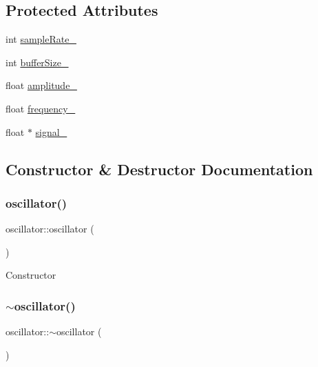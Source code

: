\subsection*{Protected Attributes}
\begin{DoxyCompactItemize}
\item 
int \hyperlink{classoscillator_aa5a47eb31b518199eaebe930ecef6a24}{sample\+Rate\+\_\+}
\item 
int \hyperlink{classoscillator_ab5c1b6a45c5d7026d91db8cbdd1e24ee}{buffer\+Size\+\_\+}
\item 
float \hyperlink{classoscillator_a5671a761666b50a469a4121ef0e0e864}{amplitude\+\_\+}
\item 
float \hyperlink{classoscillator_acf622297ac31e0013eff3fe230a5d9c9}{frequency\+\_\+}
\item 
float $\ast$ \hyperlink{classoscillator_ab8f77116d390662aa2e6ce1fa2acc54f}{signal\+\_\+}
\end{DoxyCompactItemize}


\subsection{Constructor \& Destructor Documentation}
\mbox{\label{classoscillator_aa262e2f748efad616dbdeee5862e5e95}} 
\subsubsection{\texorpdfstring{oscillator()}{oscillator()}}
{\footnotesize\ttfamily oscillator\+::oscillator (\begin{DoxyParamCaption}{ }\end{DoxyParamCaption})}

Constructor \mbox{\label{classoscillator_a17b258423ca052f1d873c40bd726f38a}} 
\subsubsection{\texorpdfstring{$\sim$oscillator()}{~oscillator()}}
{\footnotesize\ttfamily oscillator\+::$\sim$oscillator (\begin{DoxyParamCaption}{ }\end{DoxyParamCaption})}

